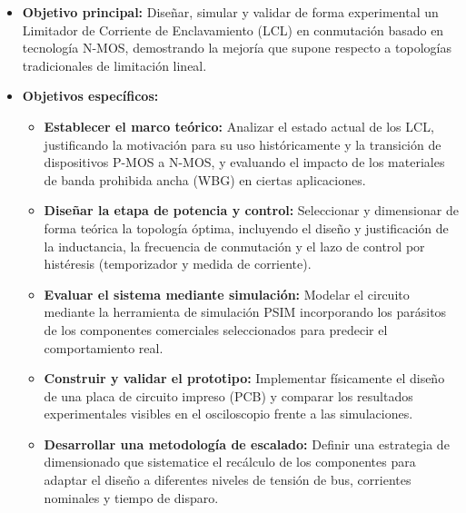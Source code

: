 \documentclass[12pt]{report} %
\begin{document}
\begin{itemize}
    \item \textbf{Objetivo principal:} Diseñar, simular y validar de forma experimental un Limitador de Corriente de Enclavamiento (LCL) en conmutación basado en tecnología N-MOS, demostrando la mejoría que supone respecto a topologías tradicionales de limitación lineal.
    
    \item \textbf{Objetivos específicos:}
    \begin{itemize}
        \item \textbf{Establecer el marco teórico:} Analizar el estado actual de los LCL, justificando la motivación para su uso históricamente y la transición de dispositivos P-MOS a N-MOS, y evaluando el impacto de los materiales de banda prohibida ancha (WBG) en ciertas aplicaciones. 
        \item \textbf{Diseñar la etapa de potencia y control:} Seleccionar y dimensionar de forma teórica la topología óptima, incluyendo el diseño y justificación de la inductancia, la frecuencia de conmutación y el lazo de control por histéresis (temporizador y medida de corriente).
        \item \textbf{Evaluar el sistema mediante simulación:} 
        Modelar el circuito mediante la herramienta de simulación PSIM incorporando los parásitos de los componentes comerciales seleccionados para predecir el comportamiento real.
        \item \textbf{Construir y validar el prototipo:} Implementar físicamente el diseño de una placa de circuito impreso (PCB) y comparar los resultados experimentales visibles en el osciloscopio frente a las simulaciones. 
        \item \textbf{Desarrollar una metodología de escalado:} Definir una estrategia de dimensionado que sistematice el recálculo de los componentes para adaptar el diseño a diferentes niveles de tensión de bus, corrientes nominales y tiempo de disparo. 
    \end{itemize}
\end{itemize}
\end{document}
